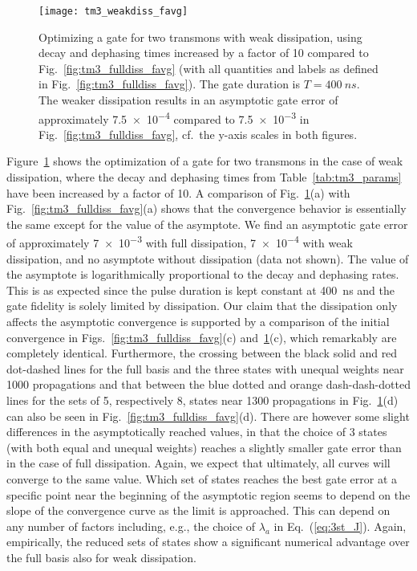 \begin{figure}[tb] %
  \centering
 \texttt{[image: tm3\_weakdiss\_favg]}
 \caption{Optimizing a \sqrtISWAP{} gate for two transmons with weak
   dissipation, using
   decay and dephasing times increased by a factor of 10 compared to
   Fig.~\ref{fig:tm3_fulldiss_favg} (with all quantities and
   labels as defined in Fig.~\ref{fig:tm3_fulldiss_favg}). The gate duration
   is $T=\SI{400}{ns}$.  The weaker dissipation results in an asymptotic gate error of
   approximately \num{7.5e-4} compared to \num{7.5e-3} in
   Fig.~\ref{fig:tm3_fulldiss_favg}, cf.\ the y-axis scales in
   both figures.
   }
 \label{fig:tm3_weakdiss_favg}
\end{figure}
Figure~\ref{fig:tm3_weakdiss_favg} shows the optimization of
a \sqrtISWAP{} gate for two transmons in the
case of weak dissipation, where the decay and dephasing times from
Table~\ref{tab:tm3_params} have been increased by a factor of 10. A comparison of
Fig.~\ref{fig:tm3_weakdiss_favg}(a) with
Fig.~\ref{fig:tm3_fulldiss_favg}(a) shows that the
convergence
behavior is essentially the same except for the value of the asymptote. We find
an asymptotic gate error of approximately \num{7e-3} with full
dissipation, \num{7e-4} with weak dissipation, and no asymptote without
dissipation (data not shown). The value of the asymptote is logarithmically
proportional to the decay and dephasing rates. This is as expected
since the pulse duration is kept constant at \SI{400}{ns} and the gate
fidelity is solely limited by
dissipation. Our claim that the dissipation only affects the asymptotic
convergence is supported by a comparison of the initial convergence
in Figs.~\ref{fig:tm3_fulldiss_favg}(c)
and~\ref{fig:tm3_weakdiss_favg}(c),
which remarkably are completely identical.
Furthermore, the crossing between the black solid and red dot-dashed lines for
the full basis and the three states with unequal weights near 1000 propagations
and that between the blue dotted and orange dash-dash-dotted lines for the sets
of 5, respectively 8, states near
1300 propagations in Fig.~\ref{fig:tm3_weakdiss_favg}(d) can
also be seen in Fig.~\ref{fig:tm3_fulldiss_favg}(d).
There are however some slight differences in the asymptotically reached values,
in that the choice of 3 states (with both equal and unequal weights) reaches a slightly
smaller gate error than in the case of full dissipation. Again, we expect that
ultimately, all curves will converge to the same value. Which set of states
reaches the best gate error at a specific point near the beginning of the
asymptotic region seems to depend on the slope of the convergence curve as the
limit is approached. This can depend on any number of factors
including, e.g., the choice
of $\lambda_a$ in Eq.~(\ref{eq:3st_J}). Again, empirically, the reduced sets of
states show a significant numerical advantage over the full basis also
for weak dissipation.

